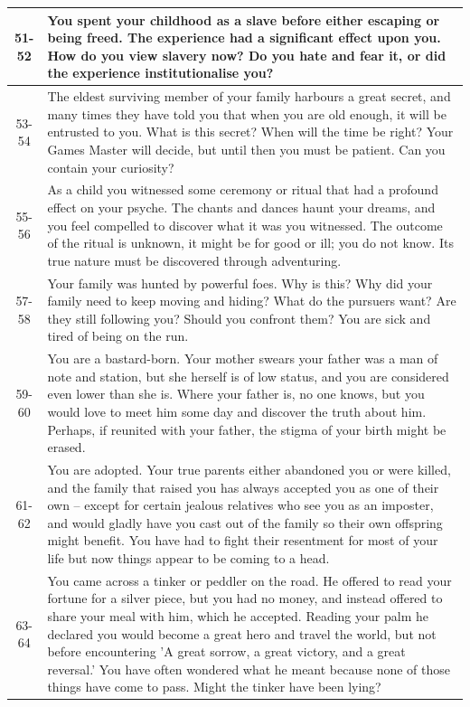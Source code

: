 \documentclass[10pt]{article}
\begin{document}
\begin{longtable}{|c|p{12cm}|}
\hline
51-52 & You spent your childhood as a slave before either escaping or being freed. The experience had a significant effect upon you. How do you view slavery now? Do you hate and fear it, or did the experience institutionalise you? \\
\hline
53-54 & The eldest surviving member of your family harbours a great secret, and many times they have told you that when you are old enough, it will be entrusted to you. What is this secret? When will the time be right? Your Games Master will decide, but until then you must be patient. Can you contain your curiosity? \\
\hline
55-56 & As a child you witnessed some ceremony or ritual that had a profound effect on your psyche. The chants and dances haunt your dreams, and you feel compelled to discover what it was you witnessed. The outcome of the ritual is unknown, it might be for good or ill; you do not know. Its true nature must be discovered through adventuring. \\
\hline
57-58 & Your family was hunted by powerful foes. Why is this? Why did your family need to keep moving and hiding? What do the pursuers want? Are they still following you? Should you confront them? You are sick and tired of being on the run. \\
\hline
59-60 & You are a bastard-born. Your mother swears your father was a man of note and station, but she herself is of low status, and you are considered even lower than she is. Where your father is, no one knows, but you would love to meet him some day and discover the truth about him. Perhaps, if reunited with your father, the stigma of your birth might be erased. \\
\hline
61-62 & You are adopted. Your true parents either abandoned you or were killed, and the family that raised you has always accepted you as one of their own – except for certain jealous relatives who see you as an imposter, and would gladly have you cast out of the family so their own offspring might benefit. You have had to fight their resentment for most of your life but now things appear to be coming to a head. \\
\hline
63-64 & You came across a tinker or peddler on the road. He offered to read your fortune for a silver piece, but you had no money, and instead offered to share your meal with him, which he accepted. Reading your palm he declared you would become a great hero and travel the world, but not before encountering 'A great sorrow, a great victory, and a great reversal.' You have often wondered what he meant because none of those things have come to pass. Might the tinker have been lying? \\

\end{longtable}
\end{document}
